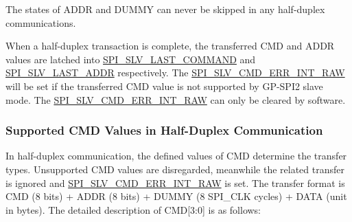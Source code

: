 \documentclass[main\_\_EN.tex]{subfiles}
\begin{document}
\begin{tiplisting}
The states of ADDR and DUMMY can never be skipped in any half-duplex communications.
\end{tiplisting}
\vspace{-1em}
When a half-duplex transaction is complete, the transferred CMD and ADDR values are latched into \hyperref[fielddesc:SPISLVLASTCOMMAND]{SPI\_SLV\_LAST\_COMMAND} and \hyperref[fielddesc:SPISLVLASTADDR]{SPI\_SLV\_LAST\_ADDR} respectively. The \hyperref[fielddesc:SPISLVCMDERRINTRAW]{SPI\_SLV\_CMD\_ERR\_INT\_RAW} will be set if the transferred CMD value is not supported by GP-SPI2 slave mode. The \hyperref[fielddesc:SPISLVCMDERRINTRAW]{SPI\_SLV\_CMD\_ERR\_INT\_RAW} can only be cleared by software.

\subsubsection{Supported CMD Values in Half-Duplex Communication} \label{GP-SPI2 HD salve format}

In half-duplex communication, the defined values of CMD determine the transfer types. Unsupported CMD values are disregarded, meanwhile the related transfer is ignored and \hyperref[fielddesc:SPISLVCMDERRINTRAW]{SPI\_SLV\_CMD\_ERR\_INT\_RAW} is set. The transfer format is CMD (8 bits) + ADDR (8 bits) + DUMMY (8 SPI\_CLK cycles) + DATA (unit in bytes). The detailed description of CMD[3:0] is as follows:
\end{document}
